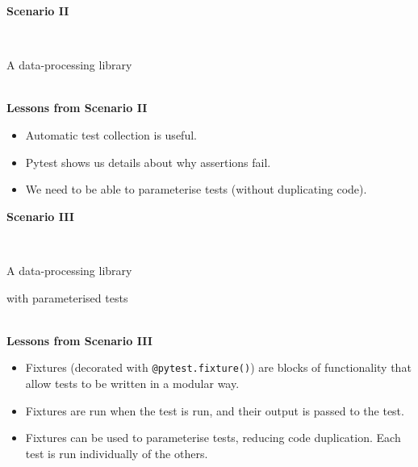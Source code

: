 \documentclass[12pt]{article}
\newlength{\geometrytop}
\newcommand{\slidetitle}[1]{~\\[-0.5ex]{\Large\bf{\color{bold}#1}}\\}
\begin{document}
\thispagestyle{plain}
\vspace*{-\topskip}
\vspace*{\fill}
{\Huge\centerline{\textbf{Scenario II}}~\newline
\centerline{A data-processing library}}
\vspace*{\fill}
\vspace*{\geometrytop}
\clearpage

\slidetitle{Lessons from Scenario II}
\begin{itemize}
\item Automatic test collection is useful.
\item Pytest shows us details about why assertions fail.
\item We need to be able to parameterise tests (without duplicating code).
\end{itemize}
\clearpage

\thispagestyle{plain}
\vspace*{-\topskip}
\vspace*{\fill}
{\Huge\centerline{\textbf{Scenario III}}~\newline
\centerline{A data-processing library}
\centerline{with parameterised tests}}
\vspace*{\fill}
\vspace*{\geometrytop}
\clearpage

\slidetitle{Lessons from Scenario III}
\begin{itemize}
\item Fixtures (decorated with \verb|@pytest.fixture()|) are blocks of
    functionality that allow tests to be written in a modular way.
\item Fixtures are run when the test is run, and their output is passed to the
    test.
\item Fixtures can be used to parameterise tests, reducing code
    duplication. Each test is run individually of the others.

\end{itemize}
\clearpage
\end{document}
